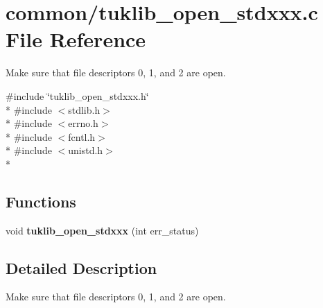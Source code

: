 \section{common/tuklib\-\_\-open\-\_\-stdxxx.c File Reference}
\label{tuklib__open__stdxxx_8c}


Make sure that file descriptors 0, 1, and 2 are open.  


{\ttfamily \#include \char`\"{}tuklib\-\_\-open\-\_\-stdxxx.\-h\char`\"{}}\\*
{\ttfamily \#include $<$stdlib.\-h$>$}\\*
{\ttfamily \#include $<$errno.\-h$>$}\\*
{\ttfamily \#include $<$fcntl.\-h$>$}\\*
{\ttfamily \#include $<$unistd.\-h$>$}\\*
\subsection*{Functions}
\begin{DoxyCompactItemize}
\item 
void {\bfseries tuklib\-\_\-open\-\_\-stdxxx} (int err\-\_\-status)\label{tuklib__open__stdxxx_8c_a8baa8536f3713be6b84596acc12b5b39}

\end{DoxyCompactItemize}


\subsection{Detailed Description}
Make sure that file descriptors 0, 1, and 2 are open. 